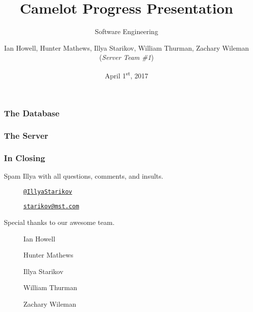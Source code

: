 \documentclass{beamer}
\title{Camelot Progress Presentation}
\subtitle{Software Engineering}
\author{Ian Howell, Hunter Mathews, Illya Starikov, William Thurman, Zachary Wileman (\textit{Server Team \#1})}
\date{April 1\textsuperscript{st}, 2017}
\institute{Missouri University of Science and Technology}
\begin{document}
\begin{frame}
    \vfill
    \centering
\end{frame}

\begin{frame}
    \maketitle
\end{frame}

\begin{frame}
    \frametitle{The Database}
\end{frame}

\begin{frame}
    \frametitle{The Server}
\end{frame}


\begin{frame}
    \frametitle{In Closing}

    Spam Illya with all questions, comments, and insults.
    \begin{description}
        \item[\faGithub]  \href{https://github.com/IllyaStarikov}{\nolinkurl{@IllyaStarikov}}
        \item[\faComment] \href{mailto:starikov@mst.edu}{\nolinkurl{starikov@mst.com}}
    \end{description}

    Special thanks to our awesome team.
    \begin{description}
        \item[\faUser] Ian Howell
        \item[\faUser] Hunter Mathews
        \item[\faUser] Illya Starikov
        \item[\faUser] William Thurman
        \item[\faUser] Zachary Wileman
    \end{description}
\end{frame}
\end{document}
